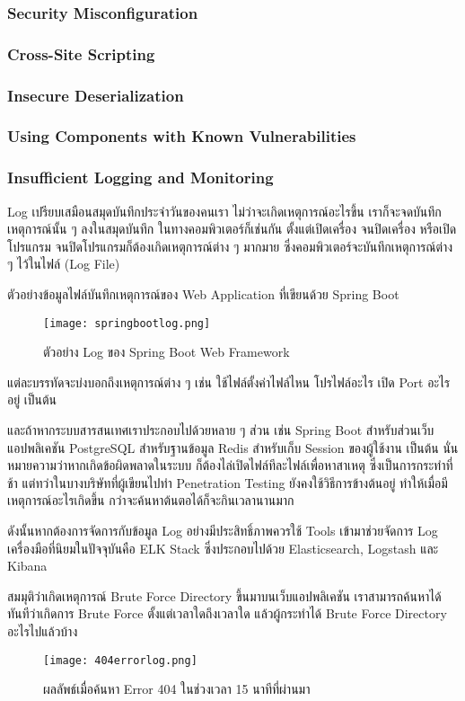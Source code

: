 \subsubsection{Security Misconfiguration}

\subsubsection{Cross-Site Scripting}

\subsubsection{Insecure Deserialization}

\subsubsection{Using Components with Known Vulnerabilities}

\subsubsection{Insufficient Logging and Monitoring}

Log เปรียบเสมือนสมุดบันทึกประจำวันของคนเรา ไม่ว่าจะเกิดเหตุการณ์อะไรขึ้น เราก็จะจดบันทึกเหตุการณ์นั้น ๆ ลงในสมุดบันทึก ในทางคอมพิวเตอร์ก็เช่นกัน ตั้งแต่เปิดเครื่อง จนปิดเครื่อง หรือเปิดโปรแกรม จนปิดโปรแกรมก็ต้องเกิดเหตุการณ์ต่าง ๆ มากมาย ซึ่งคอมพิวเตอร์จะบันทึกเหตุการณ์ต่าง ๆ ไว้ในไฟล์ (Log File)

ตัวอย่างข้อมูลไฟล์บันทึกเหตุการณ์ของ Web Application ที่เขียนด้วย Spring Boot

\begin{figure}[h]
	\centering
	\texttt{[image: springbootlog.png]}
	\caption{ตัวอย่าง Log ของ Spring Boot Web Framework}
	\label{Fig:springbootlog.png}
\end{figure}

แต่ละบรรทัดจะบ่งบอกถึงเหตุการณ์ต่าง ๆ เช่น ใช้ไฟล์ตั้งค่าไฟล์ไหน โปรไฟล์อะไร เปิด Port อะไรอยู่ เป็นต้น

และถ้าหากระบบสารสนเทศเราประกอบไปด้วยหลาย ๆ ส่วน เช่น Spring Boot สำหรับส่วนเว็บแอปพลิเคชัน PostgreSQL สำหรับฐานข้อมูล Redis สำหรับเก็บ Session ของผู้ใช้งาน เป็นต้น นั่นหมายความว่าหากเกิดข้อผิดพลาดในระบบ ก็ต้องไล่เปิดไฟล์ทีละไฟล์เพื่อหาสาเหตุ ซึ่งเป็นการกระทำที่ช้า แต่ทว่าในบางบริษัทที่ผู้เขียนไปทำ Penetration Testing ยังคงใช้วิธีการข้างต้นอยู่ ทำให้เมื่อมีเหตุการณ์อะไรเกิดขึ้น กว่าจะค้นหาต้นตอได้ก็จะกินเวลานานมาก

ดังนั้นหากต้องการจัดการกับข้อมูล Log อย่างมีประสิทธิ์ภาพควรใช้ Tools เข้ามาช่วยจัดการ Log เครื่องมือที่นิยมในปัจจุบันคือ ELK Stack ซึ่งประกอบไปด้วย Elasticsearch\cite{}, Logstash\cite{} และ Kibana\cite{}

สมมุติว่าเกิดเหตุการณ์ Brute Force Directory ขึ้นมาบนเว็บแอปพลิเคชัน เราสามารถค้นหาได้ทันทีว่าเกิดการ Brute Force ตั้งแต่เวลาใดถึงเวลาใด แล้วผู้กระทำได้ Brute Force Directory อะไรไปแล้วบ้าง

\begin{figure}[h!]
	\centering
	\texttt{[image: 404errorlog.png]}
	\caption{ผลลัพธ์เมื่อค้นหา Error 404 ในช่วงเวลา 15 นาทีที่ผ่านมา}
	\label{Fig:404errorlog.png}
\end{figure}
